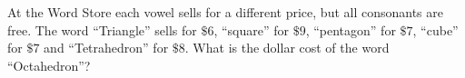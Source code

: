 At the Word Store each vowel sells for a different price, but all consonants are free. The word ``Triangle'' sells for $\$6$, ``square'' for $\$9$, ``pentagon'' for $\$7$, ``cube'' for $\$7$ and ``Tetrahedron'' for $\$8$. What is the dollar cost of the word ``Octahedron''?
